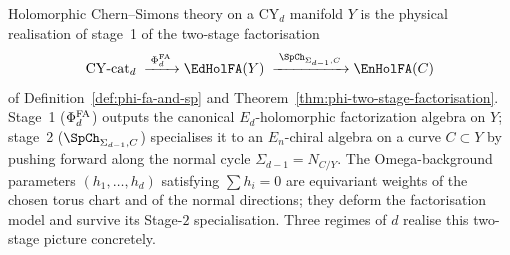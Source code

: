Holomorphic Chern--Simons theory on a CY$_d$ manifold $Y$ is the physical realisation of stage~1 of the two-stage factorisation
\[
 \mathrm{CY\text{-}cat}_d
 \;\xrightarrow{\;\PhiFA_d\;}
 \EdHolFA(Y)
 \;\xrightarrow{\;\SpCh_{\Sigma_{d-1},C}\;}
 \EnHolFA(C)
\]
of Definition~\ref{def:phi-fa-and-sp} and Theorem~\ref{thm:phi-two-stage-factorisation}. Stage~1 ($\Phi^{\mathrm{FA}}_d$) outputs the canonical $E_d$-holomorphic factorization algebra on $Y$; stage~2 ($\SpCh_{\Sigma_{d-1},C}$) specialises it to an $E_n$-chiral algebra on a curve $C \subset Y$ by pushing forward along the normal cycle $\Sigma_{d-1} = N_{C/Y}$. The Omega-background parameters $(h_1,\ldots,h_d)$ satisfying $\sum h_i = 0$ are equivariant weights of the chosen torus chart and of the normal directions; they deform the factorisation model and survive its Stage-$2$ specialisation. Three regimes of $d$ realise this two-stage picture concretely.

